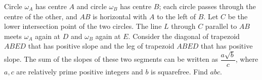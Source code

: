 Circle $\omega_A$ has centre $A$ and circle $\omega_B$ has centre $B$; each circle passes through the centre of the other, and $AB$ is horizontal with $A$ to the left of $B$. Let $C$ be the lower intersection point of the two circles. The line $L$ through $C$ parallel to $AB$ meets $\omega_A$ again at $D$ and $\omega_B$ again at $E$. Consider the diagonal of trapezoid $ABED$ that has positive slope and the leg of trapezoid $ABED$ that has positive slope. The sum of the slopes of these two segments can be written as $\dfrac{a\sqrt b}{c}$, where $a,c$ are relatively prime positive integers and $b$ is squarefree. Find $abc$.
